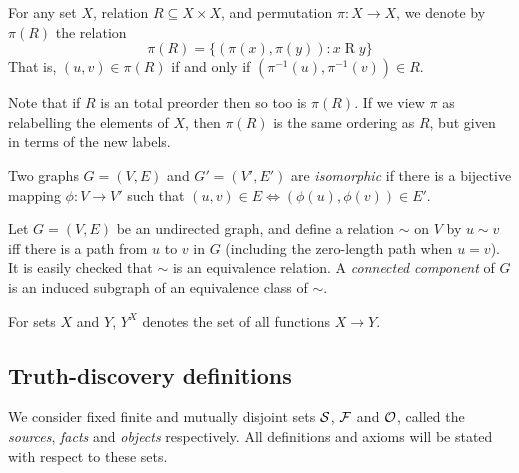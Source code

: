 \documentclass[../main.tex]{subfiles}
\begin{document}
\begin{definition}
For any set $X$, relation $R \subseteq X \times X$, and permutation $\pi: X
\rightarrow X$, we denote by $\pi(R)$ the relation
$$ \pi(R) = \{(\pi(x), \pi(y)) : x \mathbin{R} y\} $$
That is, $(u, v) \in \pi(R)$ if and only if $(\pi^{-1}(u), \pi^{-1}(v)) \in R$.
\end{definition}

Note that if $R$ is an total preorder then so too is $\pi(R)$. If we view $\pi$
as relabelling the elements of $X$, then $\pi(R)$ is the same ordering as $R$,
but given in terms of the new labels.

\begin{definition}

Two graphs $G=(V, E)$ and $G'=(V', E')$ are \emph{isomorphic} if there is a
bijective mapping $\phi: V \rightarrow V'$ such that $(u, v) \in E \iff
(\phi(u), \phi(v)) \in E'$.

\end{definition}

\begin{definition}
Let $G=(V, E)$ be an undirected graph, and define a relation $\sim$ on $V$ by
$u \sim v$ iff there is a path from $u$ to $v$ in $G$ (including the
zero-length path when $u = v$). It is easily checked that $\sim$ is an
equivalence relation. A \emph{connected component} of $G$ is an induced
subgraph of an equivalence class of $\sim$.
\end{definition}

\begin{notation}
For sets $X$ and $Y$, $Y^X$ denotes the set of all functions $X \rightarrow Y$.
\end{notation}

\subsection{Truth-discovery definitions}

We consider fixed finite and mutually disjoint sets $\S$, $\F$ and $\O$, called
the \emph{sources}, \emph{facts} and \emph{objects} respectively. All
definitions and axioms will be stated with respect to these sets.
\end{document}
